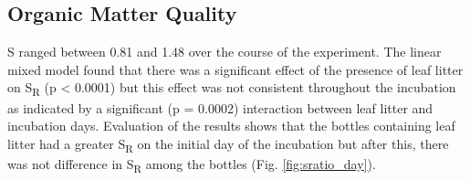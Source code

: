 
\subsection{Organic Matter Quality}

S ranged between 0.81 and 1.48 over the course of the experiment.  The linear mixed model found that there was a significant effect of the presence of leaf litter on S\textsubscript{R} (p < 0.0001) but this effect was not consistent throughout the incubation as indicated by a significant (p = 0.0002) interaction between leaf litter and incubation days. Evaluation of the results shows that the bottles containing leaf litter had a greater S\textsubscript{R} on the initial day of the incubation but after this, there was not difference in S\textsubscript{R} among the bottles (Fig. \ref{fig:sratio_day}).

